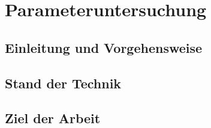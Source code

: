 \chapter{Parameteruntersuchung}
\label{chap:parameteruntersuchung}

\section{Einleitung und Vorgehensweise}
\label{sec:einleitung_und_vorgehensweise}

\section{Stand der Technik}
\label{sec:stand_der_technik}


\section{Ziel der Arbeit}
\label{sec:ziel_der_atrbeit}
